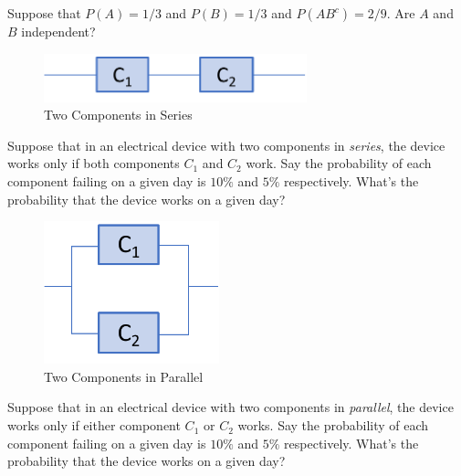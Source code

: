 \documentclass[addpoints,12pt]{exam}
\begin{document}
\begin{questions}
\vspace{1in}

\question[1] Suppose that $P(A)=1/3$ and $P(B)=1/3$ and $P(A B^c)=2/9$. Are $A$ and $B$ independent?

\vspace{1in}

\begin{figure}[h]
\centering
\includegraphics[width=3in]{component-in-series}
\caption{Two Components in Series}
\end{figure}

\question[2] Suppose that in an electrical device with two components in \emph{series}, the device works only if both components $C_1$ and $C_2$ work. Say the probability of each component failing on a given day is $10\%$ and $5\%$ respectively. What's the probability that the device works on a given day?

\vspace{1.2in}

\begin{figure}[h]
\centering
\includegraphics[width=2in]{component-in-parallelv2}
\caption{Two Components in Parallel}

\end{figure}

\question[2] Suppose that in an electrical device with two components in \emph{parallel}, the device works only if either component $C_1$ or $C_2$ works. Say the probability of each component failing on a given day is $10\%$ and $5\%$ respectively. What's the probability that the device works on a given day?

\end{questions}
\end{document}
